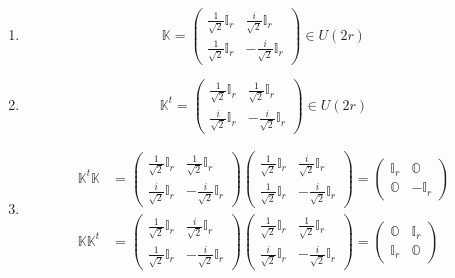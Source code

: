 \documentclass[aps, preprint]{revtex4}
\begin{document}
\begin{enumerate}
\item
\begin{equation}\mathbb{K} =\left (\begin{array}{cc}\frac{1}{\sqrt{2}} \mathbb{I}_{r} & \frac{i}{\sqrt{2}} \mathbb{I}_{r} \\
\frac{1}{\sqrt{2}} \mathbb{I}_{r} &  -\frac{i}{\sqrt{2}} \mathbb{I}_{r}\end{array}\right ) \in U \left (2 r\right )
\end{equation}

\item
\begin{equation}\mathbb{K}^{t} =\left (\begin{array}{cc}\frac{1}{\sqrt{2}} \mathbb{I}_{r} & \frac{1}{\sqrt{2}} \mathbb{I}_{r} \\
\frac{i}{\sqrt{2}} \mathbb{I}_{r} &  -\frac{i}{\sqrt{2}} \mathbb{I}_{r}\end{array}\right ) \in U \left (2 r\right )
\end{equation}

\item
\begin{align}\mathbb{K}^{t} \mathbb{K} &  =\left (\begin{array}{cc}\frac{1}{\sqrt{2}} \mathbb{I}_{r} & \frac{1}{\sqrt{2}} \mathbb{I}_{r} \\
\frac{i}{\sqrt{2}} \mathbb{I}_{r} &  -\frac{i}{\sqrt{2}} \mathbb{I}_{r}\end{array}\right ) \left (\begin{array}{cc}\frac{1}{\sqrt{2}} \mathbb{I}_{r} & \frac{i}{\sqrt{2}} \mathbb{I}_{r} \\
\frac{1}{\sqrt{2}} \mathbb{I}_{r} &  -\frac{i}{\sqrt{2}} \mathbb{I}_{r}\end{array}\right ) =\left (\begin{array}{cc}\mathbb{I}_{r} & \mathbb{O} \\
\mathbb{O} &  -\mathbb{I}_{r}\end{array}\right ) \\
\mathbb{K} \mathbb{K}^{t} &  =\left (\begin{array}{cc}\frac{1}{\sqrt{2}} \mathbb{I}_{r} & \frac{i}{\sqrt{2}} \mathbb{I}_{r} \\
\frac{1}{\sqrt{2}} \mathbb{I}_{r} &  -\frac{i}{\sqrt{2}} \mathbb{I}_{r}\end{array}\right ) \left (\begin{array}{cc}\frac{1}{\sqrt{2}} \mathbb{I}_{r} & \frac{1}{\sqrt{2}} \mathbb{I}_{r} \\
\frac{i}{\sqrt{2}} \mathbb{I}_{r} &  -\frac{i}{\sqrt{2}} \mathbb{I}_{r}\end{array}\right ) =\left (\begin{array}{cc}\mathbb{O} & \mathbb{I}_{r} \\
\mathbb{I}_{r} & \mathbb{O}\end{array}\right )\end{align}


\end{enumerate}
\end{document}
